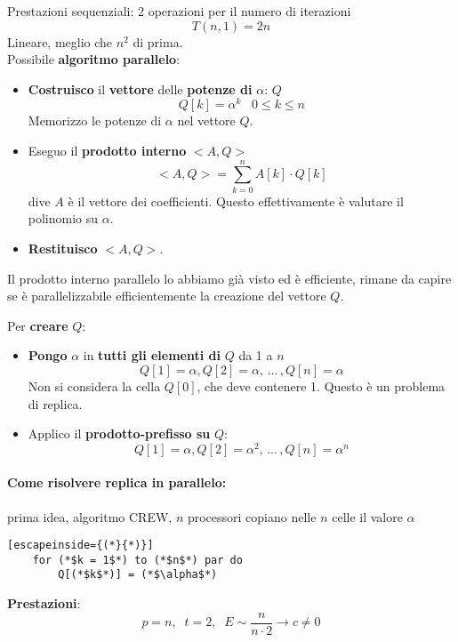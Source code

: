 Prestazioni sequenziali: 2 operazioni per il numero di iterazioni
$$ T(n, 1) = 2n $$
Lineare, meglio che $n^2$ di prima.\\

Possibile \textbf{algoritmo parallelo}:
\begin{itemize}
	\item \textbf{Costruisco} il \textbf{vettore} delle \textbf{potenze di} $\alpha$: $Q$
	$$ Q[k] = \alpha^k \;\;\; 0 \leq k \leq n $$
	Memorizzo le potenze di $\alpha$ nel vettore $Q$. \\
	
	\item Eseguo il \textbf{prodotto interno} $<A,Q>$
	$$ <A, Q> = \sum_{k=0}^n A[k] \cdot Q[k] $$
	dive $A$ è il vettore dei coefficienti. Questo effettivamente è valutare il polinomio su $\alpha$. \\
	
	\item \textbf{Restituisco} $<A, Q>$. \\
\end{itemize}

Il prodotto interno parallelo lo abbiamo già visto ed è efficiente, rimane da capire se è parallelizzabile efficientemente la creazione del vettore $Q$.\\

\newpage

Per \textbf{creare} $Q$:
\begin{itemize}
	\item \textbf{Pongo} $\alpha$ in \textbf{tutti gli elementi di} $Q$ da 1 a $n$
	$$ Q[1] = \alpha, Q[2] = \alpha, \, ... \, , Q[n] = \alpha $$
	Non si considera la cella $Q[0]$, che deve contenere 1. Questo è un problema di replica.\\
	
	\item Applico il \textbf{prodotto-prefisso su} $Q$: 
	$$ Q[1]= \alpha, Q[2] = \alpha^2 , \, ... \, , Q[n] = \alpha^n $$
\end{itemize}



\paragraph{Come risolvere replica in parallelo:} prima idea, algoritmo CREW, $n$ processori copiano nelle $n$ celle il valore $\alpha$
\begin{lstlisting}[escapeinside={(*}{*)}]
	for (*$k = 1$*) to (*$n$*) par do
		Q[(*$k$*)] = (*$\alpha$*)
\end{lstlisting}
\textbf{Prestazioni}: 
$$ p = n, \;\; t = 2, \;\; E \sim \frac{n}{n \cdot 2} \rightarrow c \neq 0 $$

